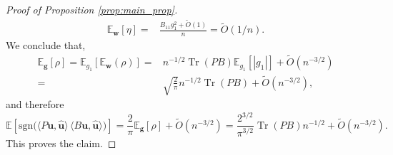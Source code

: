 \documentclass[10pt,a4paper]{amsart}
\newcommand\E{\mathbb{E}}
\newcommand\Tr{{\operatorname{Tr}}}
\newcommand\bg{\bm{g}}
\newcommand\bu{\bm{u}}
\newcommand\bw{\bm{w}}
\newcommand\hu{\hat{\bm u}}
\newcommand\rem{\tilde{O}\left(n^{-3/2}\right)}
\begin{document}
\begin{proof}[Proof of Proposition \ref{prop:main_prop}]
\begin{align*}
\E_{\bw}[\eta]=& \frac{B_{11}g_{1}^2+\tilde{O}(1)}{n}=\tilde{O}(1/n).
\end{align*}
We conclude that,
\begin{align*}
\E_{\bg}[\rho]=\E_{g_{1}}\left[\E_{\bw}(\rho)\right]= & n^{-1/2}\Tr(PB)\E_{g_{1}}\left[|g_{1}|\right]+\rem\\ = & \sqrt{\frac{2}{\pi}}n^{-1/2}\Tr(PB)+\rem,  
\end{align*}
and therefore
\begin{equation*}
 \E\!\left[\mathrm{sgn}\!\big(\langle P\bu,\hu\rangle\,
\langle B\bu,\hu\rangle\big)\right]
=  \frac{2}{\pi}\E_{\bg}[\rho]+\rem
= \frac{2^{3/2}}{\pi^{3/2}}\Tr(PB)n^{-1/2}+\rem. 
\end{equation*}
This proves the claim.
\end{proof}
\end{document}

